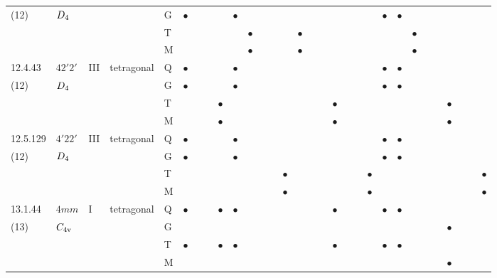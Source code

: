 \documentclass[fleqn,9pt,landscape]{jsarticle}
\begin{document}
\begin{longtable}{lllll|l|lll|ll|lll|l|lll|lll|l|ll|lll|lll}
(12) & $D_{\rm 4}$ &  &  & G & $\bullet$ &  &  &  & $\bullet$ &  &  &  &  &  &  &  &  &  &  &  & $\bullet$ & $\bullet$ &  &  &  &  &  &  &  \\
 &  &  &  & T &  &  &  &  &  & $\bullet$ &  &  &  & $\bullet$ &  &  &  &  &  &  &  &  & $\bullet$ &  &  &  &  &  &  \\
 &  &  &  & M &  &  &  &  &  & $\bullet$ &  &  &  & $\bullet$ &  &  &  &  &  &  &  &  & $\bullet$ &  &  &  &  &  &  \\ \hline
12.4.43 & \texttt{$42'2'$} & III & tetragonal & Q & $\bullet$ &  &  &  & $\bullet$ &  &  &  &  &  &  &  &  &  &  &  & $\bullet$ & $\bullet$ &  &  &  &  &  &  &  \\
(12) & $D_{\rm 4}$ &  &  & G & $\bullet$ &  &  &  & $\bullet$ &  &  &  &  &  &  &  &  &  &  &  & $\bullet$ & $\bullet$ &  &  &  &  &  &  &  \\
 &  &  &  & T &  &  &  & $\bullet$ &  &  &  &  &  &  &  &  & $\bullet$ &  &  &  &  &  &  &  &  & $\bullet$ &  &  &  \\
 &  &  &  & M &  &  &  & $\bullet$ &  &  &  &  &  &  &  &  & $\bullet$ &  &  &  &  &  &  &  &  & $\bullet$ &  &  &  \\ \hline
12.5.129 & \texttt{$4'22'$} & III & tetragonal & Q & $\bullet$ &  &  &  & $\bullet$ &  &  &  &  &  &  &  &  &  &  &  & $\bullet$ & $\bullet$ &  &  &  &  &  &  &  \\
(12) & $D_{\rm 4}$ &  &  & G & $\bullet$ &  &  &  & $\bullet$ &  &  &  &  &  &  &  &  &  &  &  & $\bullet$ & $\bullet$ &  &  &  &  &  &  &  \\
 &  &  &  & T &  &  &  &  &  &  &  &  & $\bullet$ &  &  &  &  &  &  & $\bullet$ &  &  &  &  &  &  &  &  & $\bullet$ \\
 &  &  &  & M &  &  &  &  &  &  &  &  & $\bullet$ &  &  &  &  &  &  & $\bullet$ &  &  &  &  &  &  &  &  & $\bullet$ \\ \hline
13.1.44 & \texttt{$4mm$} & I & tetragonal & Q & $\bullet$ &  &  & $\bullet$ & $\bullet$ &  &  &  &  &  &  &  & $\bullet$ &  &  &  & $\bullet$ & $\bullet$ &  &  &  &  &  &  &  \\
(13) & $C_{\rm 4v}$ &  &  & G &  &  &  &  &  &  &  &  &  &  &  &  &  &  &  &  &  &  &  &  &  & $\bullet$ &  &  &  \\
 &  &  &  & T & $\bullet$ &  &  & $\bullet$ & $\bullet$ &  &  &  &  &  &  &  & $\bullet$ &  &  &  & $\bullet$ & $\bullet$ &  &  &  &  &  &  &  \\
 &  &  &  & M &  &  &  &  &  &  &  &  &  &  &  &  &  &  &  &  &  &  &  &  &  & $\bullet$ &  &  &  \\ \hline

\end{longtable}
\end{document}
